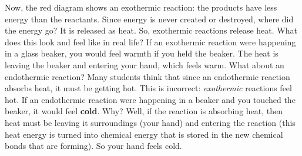 Now, the red diagram shows an exothermic reaction: 
the products have less energy than the reactants. Since energy is never created or destroyed, where did 
the energy go? It is released as heat. So, exothermic reactions release heat.
What does this look and feel like in real life? If an exothermic reaction were
happening in a glass beaker, you would feel warmth if you held the beaker. The
heat is leaving the beaker and entering your hand, which feels warm. What
about an endothermic reaction? Many students think that since an endothermic
reaction absorbs heat, it must be getting hot. This is incorrect:
\textit{exothermic} reactions feel hot. If an endothermic reaction were
happening in a beaker and you touched the beaker, it would feel \textbf{cold}.
Why? Well, if the reaction is absorbing heat, then heat must be leaving it
surroundings (your hand) and entering the reaction (this heat energy is turned
into chemical energy that is stored in the new chemical bonds that are
forming). So your hand feels cold. %


